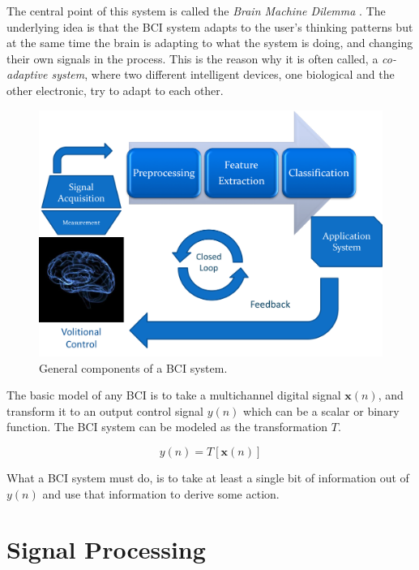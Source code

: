 The central point of this system is called the \textit{Brain Machine Dilemma} \cite{WolpawJonathanR2012}.  The underlying idea is that the BCI system adapts to the user's thinking patterns but at the same time the brain is adapting to what the system is doing, and changing their own signals in the process.  This is the reason why it is often called, a \textit{co-adaptive system}, where two different intelligent devices, one biological and the other electronic, try to adapt to each other.

\begin{figure}[]
\centering
\includegraphics[scale=0.5]{images/bcichart.png}
\caption[BCI Block Diagram]{General components of a BCI system.}
\label{fig:bciblockdiagram}
\end{figure}

The basic model of any BCI is to take a multichannel digital signal $\mathbf{x}(n)$, and transform it to an output control signal $y(n)$ which can be a scalar or binary function.  The BCI system can be modeled as the transformation $T$.

\begin{equation}
y(n) = T\left[\mathbf{x}(n)\right]
\label{eq:bcimodel}
\end{equation}

What a BCI system must do, is to take at least a single bit of information out of $y(n)$ and use that information to derive some action. 

\section{Signal Processing}

